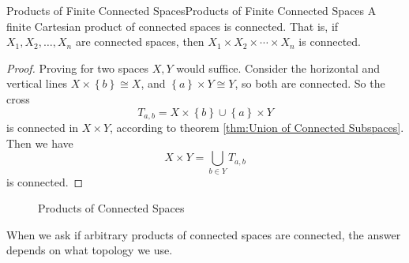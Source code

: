\documentclass[../main.tex]{subfiles}
\begin{document}
\begin{theorem}{Products of Finite Connected Spaces}{Products of Finite Connected Spaces}
A finite Cartesian product of connected spaces is connected. That is, if $X_1, X_2, \ldots, X_n$ are connected spaces, then $X_1 \times X_2 \times \cdots \times X_n$ is connected.
\end{theorem}
\begin{proof}
Proving for two spaces $X,Y$ would suffice. Consider the horizontal and vertical lines $X \times \left\{ b \right\} \cong X$, and $\left\{ a \right\} \times Y \cong Y$, so both are connected. So the cross
\begin{equation*}
T_{a,b} = X \times \left\{ b \right\} \cup \left\{ a \right\} \times Y
\end{equation*}
is connected in $X \times Y$, according to theorem \ref{thm:Union of Connected Subspaces}. Then we have
\begin{equation*}
X \times Y = \bigcup_{b\in Y} T_{a,b}
\end{equation*}
is connected.
\end{proof}

\begin{figure}[ht]
    \centering
    \caption{Products of Connected Spaces}
    \label{fig:products-of-connected-spaces}
\end{figure}

When we ask if arbitrary products of connected spaces are connected, the answer depends on what topology we use.
\end{document}

